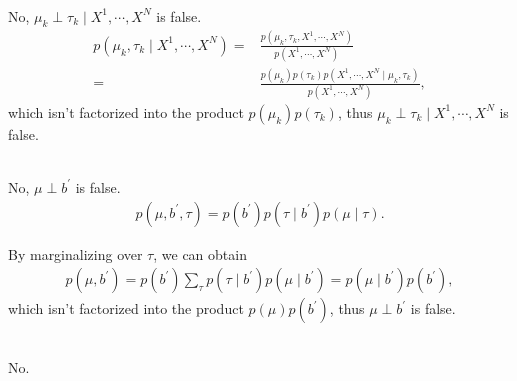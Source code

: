 \documentclass[11pt]{extarticle}
\newcommand{\0}{\mathbf{0}}
\renewcommand{\(}{\left(}
\renewcommand{\)}{\right)}
\theoremstyle{definition}
\begin{document}
\noindent{} \\
\par No, $\mu_{k} \perp \tau_{k} \mid X^{1}, \cdots, X^{N}$ is false.
\begin{align*}
    p(\mu_{k}, \tau_{k} \mid X^{1}, \cdots, X^{N}) =& \frac{p\left(\mu_{k}, \tau_{k}, X^{1}, \cdots, X^{N} \right)}{p\left(X^{1}, \cdots , X^{N} \right)} \\
    =& \frac{p(\mu_{k})p(\tau_{k})p\left(X^{1},\cdots,X^{N} \mid \mu_{k}, \tau_{k}\right)}{p\left(X^{1}, \cdots, X^{N}\right)},
\end{align*}
which isn't factorized into the product $p(\mu_{k})p(\tau_{k})$, thus $\mu_{k} \perp \tau_{k} \mid X^{1}, \cdots, X^{N}$ is false. \\

\noindent{} \\
\par No, $\mu \perp b^{'}$ is false.
\begin{align*}
    p(\mu, b^{'}, \tau) = p(b^{'}) p(\tau \mid b^{'}) p(\mu \mid \tau).
\end{align*}
\par By marginalizing over $\tau$, we can obtain
\begin{align*}
    p(\mu, b^{'}) = p(b^{'}) \sum_{\tau} p(\tau \mid b^{'}) p(\mu \mid b^{'}) = p(\mu \mid b^{'}) p(b^{'}),
\end{align*}
which isn't factorized into the product $p(\mu)p(b^{'})$, thus $\mu \perp b^{'}$ is false. \\

\noindent{} \\
\par No. \\
\end{document}
